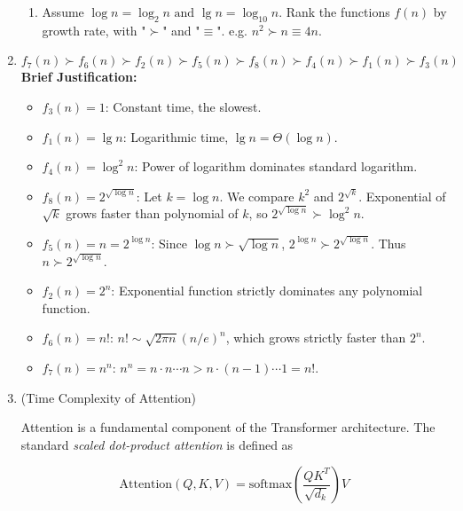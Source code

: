 \documentclass[12pt,a4paper]{article}
\makeatletter
\newtheorem*{solution}{Solution}
\theoremstyle{definition}
\renewenvironment{solution}[1][Solution] {\par\pushQED{\qed}\normalfont\topsep6\p@\@plus6\p@\relax\trivlist\item[\hskip\labelsep\bfseries#1\@addpunct{.}]\ignorespaces}{\popQED\endtrivlist\@endpefalse} \makeatother
\makeatother
\begin{document}
\begin{enumerate}
    \begin{enumerate}
        \item Assume $\log n = \log_2 n \text{ and } \lg n = \log_{10} n$. Rank the functions $f(n)$ by growth rate, with "$\succ$" and "$\equiv$". e.g. $n^2\succ n \equiv 4n$. 
    \end{enumerate}
    \begin{solution}
        \[
        f_7(n)\succ f_6(n) \succ f_2(n) \succ f_5(n) \succ f_8(n) \succ f_4(n) \succ f_1(n) \succ f_3(n)
        \]
        \textbf{Brief Justification:}
    \begin{itemize}
        \item $f_3(n) = 1$: Constant time, the slowest.
        \item $f_1(n) = \lg n$: Logarithmic time, $\lg n = \Theta(\log n)$.
        \item $f_4(n) = \log^2 n$: Power of logarithm dominates standard logarithm.
        \item $f_8(n) = 2^{\sqrt{\log n}}$: Let $k = \log n$. We compare $k^2$ and $2^{\sqrt{k}}$. Exponential of $\sqrt{k}$ grows faster than polynomial of $k$, so $2^{\sqrt{\log n}} \succ \log^2 n$.
        \item $f_5(n) = n = 2^{\log n}$: Since $\log n \succ \sqrt{\log n}$, $2^{\log n} \succ 2^{\sqrt{\log n}}$. Thus $n \succ 2^{\sqrt{\log n}}$.
        \item $f_2(n) = 2^n$: Exponential function strictly dominates any polynomial function.
        \item $f_6(n) = n!$: $n! \sim \sqrt{2\pi n}(n/e)^n$, which grows strictly faster than $2^n$.
        \item $f_7(n) = n^n$: $n^n = n \cdot n \cdots n > n \cdot (n-1) \cdots 1 = n!$.
    \end{itemize}
    \end{solution}
    \smallskip
    \item {\color{purple}(Time Complexity of Attention)}
    
    Attention is a fundamental component of the Transformer architecture. 
    The standard \textit{scaled dot-product attention} is defined as
    
    \begin{equation}
        \text{Attention}(Q, K, V) = 
        \text{softmax}\!\left(\frac{QK^{T}}{\sqrt{d_k}}\right)V
    \end{equation}
    

\end{enumerate}
\end{document}
